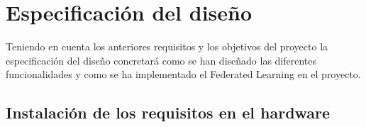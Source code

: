 \section{Especificación del diseño}
Teniendo en cuenta los anteriores requisitos y los objetivos del proyecto la especificación del diseño concretará como se han diseñado las diferentes funcionalidades y como se ha implementado el Federated Learning en el proyecto.

\subsection{Instalación de los requisitos en el hardware}
